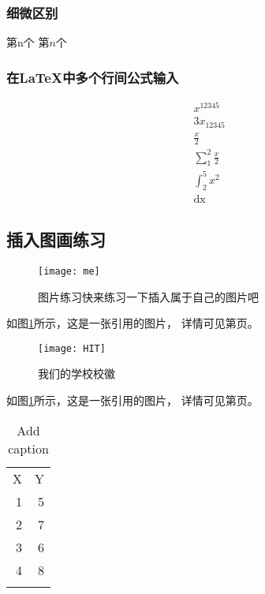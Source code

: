 \documentclass[UTF8]{ctexbook}
\begin{document}
\subsubsection{细微区别}
第n个 第$n$个 


\subsubsection{在\LaTeX  中多个行间公式输入}
\begin{align}
&x^{12345}\\
&3x_12345\\
&\frac{x}{2}\\
&\sum_{1}^{2}\frac{x}{2}\\
&\int_{2}^{5}x^2\\
&\mathrm{dx}
\end{align}





\subsection{插入图画练习}
\begin{figure}[htpb] %
	\centering
	\texttt{[image: me]}
	\caption{图片练习快来练习一下插入属于自己的图片吧}
	\label{fig:me}
\end{figure}
如图\ref{fig:me}所示，这是一张引用的图片，
详情可见第\pageref{fig:me}页。


\begin{figure}[htpb] %
	\centering
	\texttt{[image: HIT]}
	\caption{我们的学校校徽}
	\label{fig:HIT}
\end{figure}


如图\ref{fig:me}所示，这是一张引用的图片，
详情可见第\pageref{fig:me}页。


\begin{table}[htbp]
	\centering
	\caption{Add caption}
	\begin{tabular}{r|r}
		\multicolumn{1}{l}{X} & \multicolumn{1}{l}{Y} \\
		1     & 5 \\ \hline
		2     & 7 \\ \hline
		3     & 6 \\
		4     & 8 \\
		&  \\
	\end{tabular}%
	\label{tab:addlabel}%
\end{table}%
\end{document}
